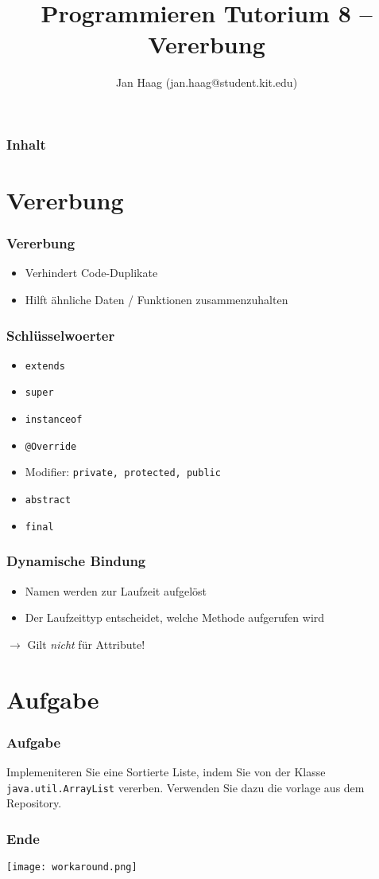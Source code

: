 \documentclass{beamer}
\author{Jan Haag (jan.haag@student.kit.edu)}
\title{Programmieren Tutorium 8 -- Vererbung}
\institute{Institut f\"{u}r Zeritfizierbare und Vertrauensw\"{u}rdige Informatiksysteme (ZVI)}
\begin{document}
\begin{frame}
\maketitle
\end{frame}

\begin{frame}
\frametitle{Inhalt}
\tableofcontents
\end{frame}

\section{Vererbung}
\begin{frame}
\frametitle{Vererbung}
\begin{itemize}
\item Verhindert Code-Duplikate
\item Hilft \"{a}hnliche Daten / Funktionen zusammenzuhalten
\end{itemize}
\end{frame}

\begin{frame}[fragile]
\frametitle{Schl\"{u}sselwoerter}
\begin{itemize}
\item \verb|extends|
\item \verb|super|
\item \verb|instanceof|
\item \verb|@Override|
\item Modifier: \verb|private, protected, public|
\item \verb|abstract|
\item \verb|final|
\end{itemize}
\end{frame}

\begin{frame}
\frametitle{Dynamische Bindung}
\begin{itemize}
\item Namen werden zur Laufzeit aufgel\"{o}st
\item Der Laufzeittyp entscheidet, welche Methode aufgerufen wird
\end{itemize}
$\rightarrow{}$ Gilt \emph{nicht} f\"{u}r Attribute!
\end{frame}

\section{Aufgabe}
\begin{frame}[fragile]
\frametitle{Aufgabe}
Implemeniteren Sie eine Sortierte Liste, indem Sie von der Klasse
\verb|java.util.ArrayList| vererben. Verwenden Sie dazu die vorlage aus dem
Repository.
\end{frame}

\begin{frame}
\frametitle{Ende}
\texttt{[image: workaround.png]}
\end{frame}
\end{document}
